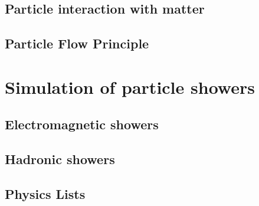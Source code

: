 \subsection{Particle interaction with matter}
\subsection{Particle Flow Principle}
\section{Simulation of particle showers}
\subsection{Electromagnetic showers}
\subsection{Hadronic showers}
\subsection{Physics Lists}
